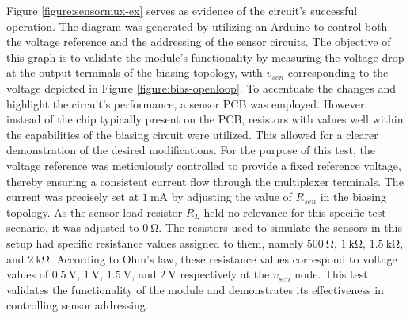 Figure \ref{figure:sensormux-ex} serves as evidence of the circuit's successful operation. The diagram was generated by utilizing an Arduino to control both the voltage reference and the addressing of the sensor circuits. The objective of this graph is to validate the module's functionality by measuring the voltage drop at the output terminals of the biasing topology, with $v_{sen}$ corresponding to the voltage depicted in Figure \ref{figure:bias-openloop}. To accentuate the changes and highlight the circuit's performance, a sensor \ac{PCB} was employed. However, instead of the chip typically present on the \ac{PCB}, resistors with values well within the capabilities of the biasing circuit were utilized. This allowed for a clearer demonstration of the desired modifications. For the purpose of this test, the voltage reference was meticulously controlled to provide a fixed reference voltage, thereby ensuring a consistent current flow through the multiplexer terminals. The current was precisely set at $\mathrm{1~mA}$ by adjusting the value of $R_{sen}$ in the biasing topology. As the sensor load resistor $R_{L}$ held no relevance for this specific test scenario, it was adjusted to $\mathrm{0~\Omega}$. The resistors used to simulate the sensors in this setup had specific resistance values assigned to them, namely $\mathrm{500~\Omega}$, $\mathrm{1~k\Omega}$, $\mathrm{1.5~k\Omega}$, and $\mathrm{2~k\Omega}$. According to Ohm's law, these resistance values correspond to voltage values of $\mathrm{0.5~V}$, $\mathrm{1~V}$, $\mathrm{1.5~V}$, and $\mathrm{2~V}$ respectively at the $v_{sen}$ node. This test validates the functionality of the module and demonstrates its effectiveness in controlling sensor addressing.


